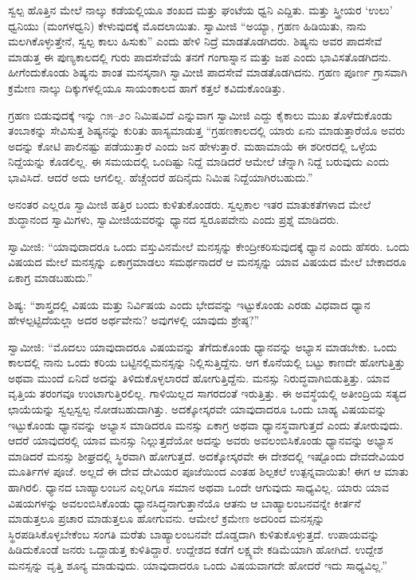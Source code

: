  ಸ್ವಲ್ಪ ಹೊತ್ತಿನ ಮೇಲೆ ನಾಲ್ಕು ಕಡೆಯಲ್ಲಿಯೂ ಶಂಖದ ಮತ್ತು ಘಂಟೆಯ ಧ್ವನಿ ಎದ್ದಿತು. ಮತ್ತು ಸ್ತ್ರೀಯರ ‘ಉಲು’ ಧ್ವನಿಯು (ಮಂಗಳಧ್ವನಿ) ಕೇಳುವುದಕ್ಕೆ ಮೊದಲಾಯಿತು. ಸ್ವಾಮೀಜಿ “ಅಯ್ಯಾ, ಗ್ರಹಣ ಹಿಡಿಯಿತು, ನಾನು ಮಲಗಿಕೊಳ್ಳುತ್ತೇನೆ, ಸ್ವಲ್ಪ ಕಾಲು ಹಿಸುಕು” ಎಂದು ಹೇಳಿ ನಿದ್ರೆ ಮಾಡತೊಡಗಿದರು. ಶಿಷ್ಯನು ಅವರ ಪಾದಸೇವೆ ಮಾಡುತ್ತ ಈ ಪುಣ್ಯಕಾಲದಲ್ಲಿ ಗುರು ಪಾದಸೇವೆಯೆ ತನಗೆ ಗಂಗಾಸ್ನಾನ ಮತ್ತು ಜಪ ಎಂದು ಭಾವಿಸತೊಡಗಿದನು. ಹೀಗೆಂದುಕೊಂಡು ಶಿಷ್ಯನು ಶಾಂತ ಮನಸ್ಕನಾಗಿ ಸ್ವಾಮೀಜಿ ಪಾದಸೇವೆ ಮಾಡತೊಡಗಿದನು. ಗ್ರಹಣ ಪೂರ್ಣ ಗ್ರಾಸವಾಗಿ ಕ್ರಮೇ‌ಣ ನಾಲ್ಕು ದಿಕ್ಕುಗಳಲ್ಲಿಯೂ ಸಾಯಂಕಾಲದ ಹಾಗೆ ಕತ್ತಲೆ ಕವಿದುಕೊಂಡಿತ್ತು. 

ಗ್ರಹಣ ಬಿಡುವುದಕ್ಕೆ ಇನ್ನು ೧೫–೨೦ ನಿಮಿಷವಿದೆ ಎನ್ನುವಾಗ ಸ್ವಾಮೀಜಿ ಎದ್ದು ಕೈಕಾಲು ಮುಖ ತೊಳೆದುಕೊಂಡು ತಂಬಾಕನ್ನು ಸೇವಿಸುತ್ತ ಶಿಷ್ಯನನ್ನು ಕುರಿತು ಹಾಸ್ಯಮಾಡುತ್ತ “ಗ್ರಹಣಕಾಲದಲ್ಲಿ ಯಾರು ಏನು ಮಾಡುತ್ತಾರೆಯೊ ಅವರು ಅದನ್ನು ಕೋಟಿ ಪಾಲಿನಷ್ಟು ಪಡೆಯುತ್ತಾರೆ ಎಂದು ಜನ ಹೇಳುತ್ತಾರೆ. ಮಹಾಮಾಯೆ ಈ ಶರೀರದಲ್ಲಿ ಒಳ್ಳೆಯ ನಿದ್ದೆಯನ್ನು ಕೊಡಲಿಲ್ಲ. ಈ ಸಮಯದಲ್ಲಿ ಒಂದಿಷ್ಟು ನಿದ್ದೆ ಮಾಡಿದರೆ ಆಮೇಲೆ ಚೆನ್ನಾಗಿ ನಿದ್ದೆ ಬರುವುದು ಎಂದು ಭಾವಿಸಿದೆ. ಆದರೆ ಅದು ಆಗಲಿಲ್ಲ. ಹೆಚ್ಚೆಂದರೆ ಹದಿನೈದು ನಿಮಿಷ ನಿದ್ದೆಯಾಗಿರಬಹುದು.” 

 ಅನಂತರ ಎಲ್ಲರೂ ಸ್ವಾಮೀಜಿ ಹತ್ತಿರ ಬಂದು ಕುಳಿತುಕೊಂಡರು. ಸ್ವಲ್ಪಕಾಲ ಇತರ ಮಾತುಕತೆಗಳಾದ ಮೇಲೆ ಶುದ್ಧಾನಂದ ಸ್ವಾಮಿಗಳು, ಸ್ವಾಮೀಜಿಯವರನ್ನು ಧ್ಯಾನದ ಸ್ವರೂಪವೇನು ಎಂದು ಪ್ರಶ್ನೆ ಮಾಡಿದರು. 

 ಸ್ವಾಮೀಜಿ: “ಯಾವುದಾದರೂ ಒಂದು ವಸ್ತುವಿನಮೇಲೆ ಮನಸ್ಸನ್ನು ಕೇಂದ್ರೀಕರಿಸುವುದಕ್ಕೆ ಧ್ಯಾನ ಎಂದು ಹೆಸರು. ಒಂದು ವಿಷಯದ ಮೇಲೆ ಮನಸ್ಸನ್ನು ಏಕಾಗ್ರಮಾಡಲು ಸಮರ್ಥನಾದರೆ ಆ ಮನಸ್ಸನ್ನು ಯಾವ ವಿಷಯದ ಮೇಲೆ ಬೇಕಾದರೂ ಏಕಾಗ್ರ ಮಾಡಬಹುದು.” 

 ಶಿಷ್ಯ: “ಶಾಸ್ತ್ರದಲ್ಲಿ ವಿಷಯ ಮತ್ತು ನಿರ್ವಿಷಯ ಎಂದು ಭೇದವನ್ನು ಇಟ್ಟುಕೊಂಡು ಎರಡು ವಿಧವಾದ ಧ್ಯಾನ ಹೇಳಲ್ಪಟ್ಟಿದೆಯಲ್ಲಾ ಅದರ ಅರ್ಥವೇನು? ಅವುಗಳಲ್ಲಿ ಯಾವುದು ಶ್ರೇಷ್ಠ?” 

 ಸ್ವಾಮೀಜಿ: “ಮೊದಲು ಯಾವುದಾದರೂ ವಿಷಯವನ್ನು ತೆಗೆದುಕೊಂಡು ಧ್ಯಾನವನ್ನು ಅಭ್ಯಾಸ ಮಾಡಬೇಕು. ಒಂದು ಕಾಲದಲ್ಲಿ ನಾನು ಒಂದು ಕರಿಯ ಬಟ್ಟಿನಲ್ಲಿ\break ಮನಸ್ಸನ್ನು ನಿಲ್ಲಿಸುತ್ತಿದ್ದೆನು. ಆಗ ಕೊನೆಯಲ್ಲಿ ಬಟ್ಟು ಕಾಣದೇ ಹೋಗುತ್ತಿತ್ತು ಅಥವಾ ಮುಂದೆ ಏನಿದೆ ಅದನ್ನು ತಿಳಿದುಕೊಳ್ಳಲಾರದೆ ಹೋಗುತ್ತಿದ್ದೆನು. ಮನಸ್ಸು ನಿರುದ್ಧವಾಗಿಬಿಡುತ್ತಿತ್ತು. ಯಾವ ವೃತ್ತಿಯ ತರಂಗವೂ ಉಂಟಾಗುತ್ತಿರಲಿಲ್ಲ. ಗಾಳಿಯಿಲ್ಲದ ಸಾಗರದಂತೆ ಇರುತ್ತಿತ್ತು. ಈ ಅವಸ್ಥೆಯಲ್ಲಿ ಅತೀಂದ್ರಿಯ ಸತ್ಯದ ಛಾಯೆಯನ್ನು ಸ್ವಲ್ಪಸ್ವಲ್ಪ ನೋಡಬಹುದಾಗಿತ್ತು. ಅದಕ್ಕೋಸ್ಕರವೇ ಯಾವುದಾದರೂ ಒಂದು ಬಾಹ್ಯ ವಿಷಯವನ್ನು ಇಟ್ಟುಕೊಂಡು ಧ್ಯಾನವನ್ನು ಅಭ್ಯಾಸ ಮಾಡಿದರೂ ಮನಸ್ಸು ಏಕಾಗ್ರ ಅಥವಾ ಧ್ಯಾನಸ್ಥವಾಗುತ್ತದೆ ಎಂದು ತೋರುವುದು. ಆದರೆ ಯಾವುದರಲ್ಲಿ ಯಾವ ಮನಸ್ಸು ನಿಲ್ಲುತ್ತದೆಯೋ ಅದನ್ನು ಅವರು ಅವಲಂಬಿಸಿಕೊಂಡು ಧ್ಯಾನವನ್ನು ಅಭ್ಯಾಸ ಮಾಡಿದರೆ ಮನಸ್ಸು ಶೀಘ್ರದಲ್ಲಿ ಸ್ಥಿರವಾಗಿ ಹೋಗುತ್ತದೆ. ಅದಕ್ಕೋಸ್ಕರವೇ ಈ ದೇಶದಲ್ಲಿ ಇಷ್ಟೊಂದು ದೇವದೇವಿಯರ ಮೂರ್ತಿಗಳ ಪೂಜೆ. ಅಲ್ಲದೆ ಈ ದೇವ ದೇವಿಯರ ಪೂಜೆಯಿಂದ ಎಂತಹ ಶಿಲ್ಪಕಲೆ ಉತ್ಪನ್ನವಾಯಿತು! ಈಗ ಆ ಮಾತು ಹಾಗಿರಲಿ. ಧ್ಯಾನದ ಬಾಹ್ಯಾಲಂಬನ ಎಲ್ಲರಿಗೂ ಸಮಾನ ಅಥವಾ ಒಂದೇ ಆಗುವುದು ಸಾಧ್ಯವಿಲ್ಲ. ಯಾರು ಯಾವ ವಿಷಯಗಳನ್ನು ಅವಲಂಬಿಸಿಕೊಂಡು ಧ್ಯಾನಸಿದ್ಧನಾಗುತ್ತಾನೆಯೊ ಆತನು ಆ ಬಾಹ್ಯಾಲಂಬನವನ್ನೇ ಕೀರ್ತನೆ ಮಾಡುತ್ತಲೂ ಪ್ರಚಾರ ಮಾಡುತ್ತಲೂ ಹೋಗುವನು. ಆಮೇಲೆ ಕ್ರಮೇಣ ಅದರಿಂದ ಮನಸ್ಸನ್ನು ಸ್ಥಿರಪಡಿಸಿಕೊಳ್ಳಬೇಕೆಂಬ ಸಂಗತಿ ಮರೆತು ಬಾಹ್ಯಾಲಂಬನವೇ ದೊಡ್ಡದಾಗಿ ಕುಳಿತುಕೊಳ್ಳುತ್ತದೆ. ಉಪಾಯವನ್ನು ಹಿಡಿದುಕೊಂಡೆ ಜನರು ಒದ್ದಾಡುತ್ತ ಕುಳಿತಿದ್ದಾರೆ. ಉದ್ದೇಶದ ಕಡೆಗೆ ಲಕ್ಷ್ಯವೇ ಕಡಿಮೆಯಾಗಿ ಹೋಗಿದೆ. ಉದ್ದೇಶ ಮನಸ್ಸನ್ನು ವೃತ್ತಿ ಶೂನ್ಯ ಮಾಡುವುದು. ಯಾವುದಾದರೂ ಒಂದು ವಿಷಯವಾಗದೇ ಹೋದರೆ ಇದು ಸಾಧ್ಯವಿಲ್ಲ.” 

